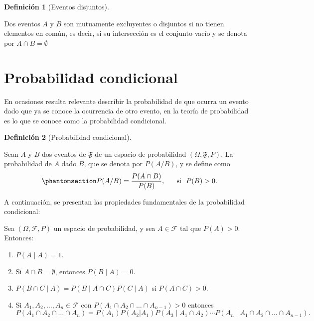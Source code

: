 \documentclass[
  us-letterpaper,
]{scrreprt}
\theoremstyle{plain}
\theoremstyle{definition}
\newtheorem{definition}{Definición}[chapter]
\theoremstyle{definition}
\theoremstyle{remark}
\begin{document}
\begin{definition}[Eventos
disjuntos]\protect\hypertarget{def-disjuntos}{}\label{def-disjuntos}

Dos eventos \(A\) y \(B\) son mutuamente excluyentes o disjuntos si no
tienen elementos en común, es decir, si su intersección es el conjunto
vacío y se denota por \(A \cap B = \emptyset\)

\end{definition}

\section{Probabilidad condicional}\label{probabilidad-condicional}

En ocasiones resulta relevante describir la probabilidad de que ocurra
un evento dado que ya se conoce la ocurrencia de otro evento, en la
teoría de probabilidad es lo que se conoce como la probabilidad
condicional.

\begin{definition}[Probabilidad
condicional]\protect\hypertarget{def-pcondicional}{}\label{def-pcondicional}

Sean \(A\) y \(B\) dos eventos de \(\mathfrak{F}\) de un espacio de
probabilidad \((\Omega, \mathfrak{F}, P)\). La probabilidad de \(A\)
dado \(B\), que se denota por \(P(A/B)\), y se define como
\begin{equation}\phantomsection\label{eq-pcondicional}{
P(A/B) = \dfrac{P(A \cap B ) }{P(B) } , \  \ \ \ \ \text{si} \ \ P(B)>0.
}\end{equation}

\end{definition}

A continuación, se presentan las propiedades fundamentales de la
probabilidad condicional:

Sea \((\Omega, \mathcal{F}, P)\) un espacio de probabilidad, y sea
\(A \in \mathcal{F}\) tal que \(P(A) > 0\). Entonces:

\begin{enumerate}
\def\labelenumi{\arabic{enumi}.}
\item
  \(P(A \mid A) = 1\).
\item
  Si \(A \cap B = \emptyset\), entonces \(P(B \mid A) = 0\).
\item
  \(P(B \cap C \mid A) = P(B \mid A \cap C) P(C \mid A)\) si
  \(P(A \cap C) > 0\).
\item
  Si \(A_1, A_2, \dots, A_n \in \mathcal{F}\) con
  \(P(A_1 \cap A_2 \cap \dots \cap A_{n-1}) > 0\) entonces
  \[ P(A_1 \cap A_2 \cap \dots \cap A_n) = P(A_1) P(A_2 | A_1) P(A_3 \mid A_1 \cap A_2) \cdots P(A_n \mid A_1 \cap A_2 \cap \dots \cap A_{n-1}).\]
\end{enumerate}
\end{document}
